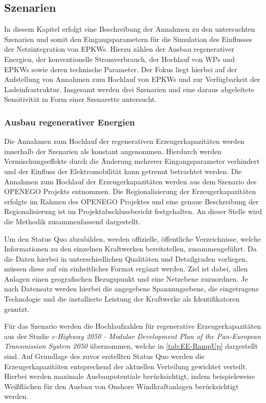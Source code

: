 \subsection{Szenarien}

In diesem Kapitel erfolgt eine Beschreibung der Annahmen zu den untersuchten Szenarien und somit den Eingangsparametern für die Simulation des Einflusses der Netzintegration von \glspl{EPKW}.
Hierzu zählen der Ausbau regenerativer Energien, der konventionelle Stromverbrauch, der Hochlauf von \glspl{WP} und \glspl{EPKW} sowie deren technische Parameter.
Der Fokus liegt hierbei auf der Aufstellung von Annahmen zum Hochlauf von \glspl{EPKW} und zur Verfügbarkeit der Ladeinfrastruktur.
Insgesamt werden drei Szenarien und eine daraus abgeleitete Sensitivität in Form einer Szenarette untersucht.


\subsubsection{Ausbau regenerativer Energien}

Die Annahmen zum Hochlauf der regenerativen Erzeugerkapazitäten werden innerhalb der Szenarien als konstant angenommen.
Hierdurch werden Vermischungseffekte durch die Änderung mehrerer Eingangsparameter verhindert und der Einfluss der Elektromobilität kann getrennt betrachtet werden.
Die Annahmen zum Hochlauf der Erzeugerkapazitäten werden aus dem Szenario \ego des \gls{OPENEGO} Projekts entnommen.
Die Regionalisierung der Erzeugerkapazitäten erfolgte im Rahmen des \gls{OPENEGO} Projektes und eine genaue Beschreibung der Regionalisierung ist im Projektabschlussbericht \cite{Mueller2019} festgehalten.
An dieser Stelle wird die Methodik zusammenfassend dargestellt.\medskip

Um den Status Quo abzubilden, werden offizielle, öffentliche Verzeichnisse, welche Informationen zu den einzelnen Kraftwerken bereitstellen, zusammengeführt.
Da die Daten hierbei in unterschiedlichen Qualitäten und Detailgraden vorliegen, müssen diese auf ein einheitliches Format ergänzt werden.
Ziel ist dabei, allen Anlagen einen geografischen Bezugspunkt und eine Netzebene zuzuordnen.
Je nach Datensatz werden hierbei die angegebene Spannungsebene, die eingetragene Technologie und die installierte Leistung der Kraftwerke als Identifikatoren genutzt.\medskip

Für das Szenario \ego werden die Hochlaufzahlen für regenerative Erzeugerkapazitäten aus der Studie \textit{e-Highway 2050 - Modular Development Plan of the Pan-European Transmission System 2050} \cite{EEHPG2015} übernommen, welche in \autoref{tab:EE-RampUp} dargestellt sind.
Auf Grundlage des zuvor erstellten Status Quo werden die Erzeugerkapazitäten entsprechend der aktuellen Verteilung gewichtet verteilt.
Hierbei werden maximale Ausbaupotentiale berücksichtigt, indem beispielsweise Weißflächen für den Ausbau von Onshore Windkraftanlagen berücksichtigt werden.

